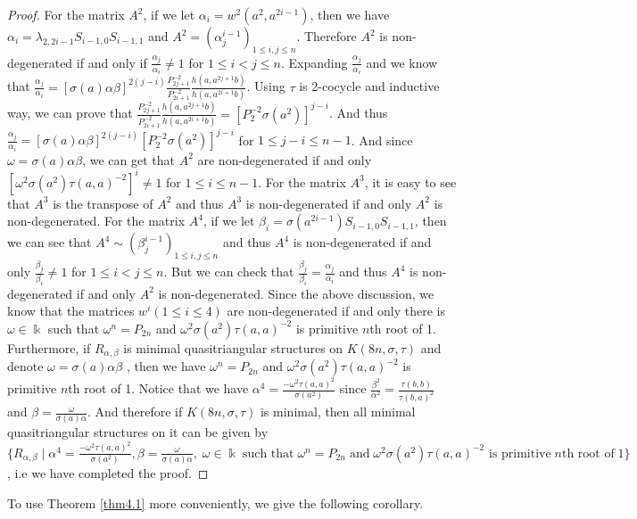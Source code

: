 \documentclass[a4paper,11pt]{amsart}
\numberwithin{equation}{section}
\begin{document}
\begin{proof}
For the matrix $A^2$, if we let $\alpha_i=w^2(a^2,a^{2i-1})$, then we have $\alpha_i=\lambda_{2,2i-1}S_{i-1,0}S_{i-1,1}$ and $A^2=(\alpha_j^{i-1})_{1\leq i,j \leq n}$. Therefore $A^2$ is non-degenerated if and only if $\frac{\alpha_j}{\alpha_i}\neq 1$ for $1\leq i< j \leq n$. Expanding $\frac{\alpha_j}{\alpha_i}$ and we know that
$\frac{\alpha_j}{\alpha_i}=[\sigma(a)\alpha\beta]^{2(j-i)} \frac{P_{2j+1}^{-2}}{P_{2i+1}^{-2}} \frac{h(a,a^{2j+1}b)}{h(a,a^{2i+1}b)}$. Using $\tau$ is 2-cocycle and inductive way, we can prove that $\frac{P_{2j+1}^{-2}}{P_{2i+1}^{-2}} \frac{h(a,a^{2j+1}b)}{h(a,a^{2i+1}b)}=[P_2^{-2}\sigma(a^2)]^{j-i}$. And thus $\frac{\alpha_j}{\alpha_i}=[\sigma(a)\alpha\beta]^{2(j-i)}[P_2^{-2}\sigma(a^2)]^{j-i}$ for $1\leq j-i \leq n-1$. And since $\omega=\sigma(a)\alpha\beta$, we can get that $A^2$ are non-degenerated if and only $[\omega^2 \sigma(a^2)\tau(a,a)^{-2}]^{i}\neq 1$ for $1 \leq i \leq n-1$. For the matrix $A^3$, it is easy to see that $A^3$ is the transpose of $A^2$ and thus $A^3$ is non-degenerated if and only $A^2$ is non-degenerated. For the matrix $A^4$, if we let $\beta_i=\sigma(a^{2i-1})S_{i-1,0}S_{i-1,1}$, then we can see that $A^4 \sim (\beta_j^{i-1})_{1\leq i,j \leq n}$ and thus $A^4$ is non-degenerated if and only $\frac{\beta_j}{\beta_i}\neq 1$ for $1\leq i< j \leq n$. But we can check that $\frac{\beta_j}{\beta_i}=\frac{\alpha_{j}}{\alpha_{i}}$ and thus $A^4$ is non-degenerated if and only $A^2$ is non-degenerated. Since the above discussion, we know that the matrices $w^{i}(1\leq i\leq4)$ are non-degenerated if and only there is $\omega \in \Bbbk$ such that $\omega^n=P_{2n}$ and $\omega^2 \sigma(a^2)\tau(a,a)^{-2}$ is primitive $n$th root of 1. Furthermore, if $R_{\alpha,\beta}$ is minimal quasitriangular structures on $K(8n,\sigma,\tau)$ and denote $\omega=\sigma(a)\alpha\beta$ , then we have $\omega^n=P_{2n}$ and $\omega^2 \sigma(a^2)\tau(a,a)^{-2}$ is primitive $n$th root of 1. Notice that we have
$\alpha^4=\frac{-\omega^2\tau(a,a)^2}{\sigma(a^2)}$ since $\frac{\beta^2}{\alpha^2}=\frac{\tau(b,b)}{\tau(b,a)^2}$ and $\beta=\frac{\omega}{\sigma(a)\alpha}$. And therefore if $K(8n,\sigma,\tau)$ is minimal, then all minimal quasitriangular structures on it can be given by
 $\{R_{\alpha,\beta}\;|\;\alpha^4=\frac{-\omega^2\tau(a,a)^2}{\sigma(a^2)}, \beta=\frac{\omega}{\sigma(a)\alpha} ,\; \omega \in \Bbbk \; \text{such that}\; \omega^n=P_{2n} \;\text{and} \; \omega^2 \sigma(a^2) \tau(a,a)^{-2} \text{ is primitive} \;n\text{th root of}\;1\}$, i.e we have completed the proof.
 \fi
\end{proof}
To use Theorem \ref{thm4.1} more conveniently, we give the following corollary.
\end{document}
